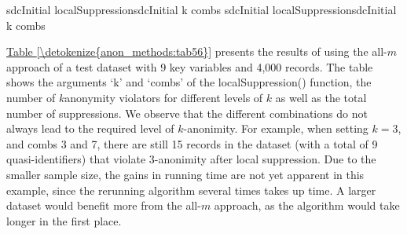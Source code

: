 \documentclass[letterpaper,10pt,english]{sphinxmanual}
\begin{document}
\def\sphinxLiteralBlockLabel{\label{\detokenize{anon_methods:code58}}}
%
\begin{sphinxVerbatim}[commandchars=\\\{\},numbers=left,firstnumber=1,stepnumber=1]
 sdcInitial  localSuppressionsdcInitial k   combs   
 sdcInitial  localSuppressionsdcInitial k    combs   
\end{sphinxVerbatim}

\hyperref[\detokenize{anon_methods:tab56}]{Table \ref{\detokenize{anon_methods:tab56}}} presents the results of using the all-\(m\) approach of
a test dataset with 9 key variables and 4,000 records. The table shows
the arguments ‘k’ and ‘combs’ of the localSuppression() function, the
number of \(k\)\sphinxstyleemphasis{-}anonymity violators for different levels of
\(k\) as well as the total number of suppressions. We observe that
the different combinations do not always lead to the required level of
\(k\)-anonimity. For example, when setting \(k = 3\), and combs
3 and 7, there are still 15 records in the dataset (with a total of 9
quasi-identifiers) that violate 3-anonimity after local suppression. Due
to the smaller sample size, the gains in running time are not yet
apparent in this example, since the rerunning algorithm several times
takes up time. A larger dataset would benefit more from the all-\(m\)
approach, as the algorithm would take longer in the first place.
\end{document}
